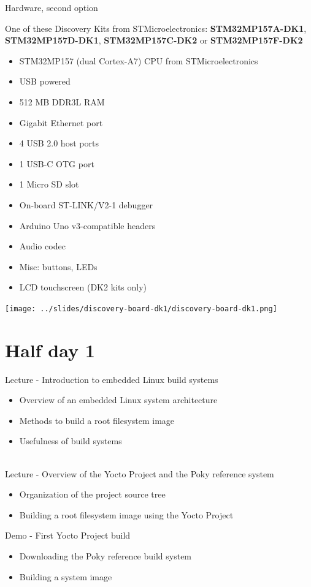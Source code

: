 \documentclass[a4paper,12pt,obeyspaces,spaces,hyphens]{article}
\begin{document}
\feagendatwocolumn
{Hardware, second option}
{
  One of these Discovery Kits from STMicroelectronics: {\bf
  STM32MP157A-DK1}, {\bf STM32MP157D-DK1}, {\bf STM32MP157C-DK2} or
  {\bf STM32MP157F-DK2}
  \begin{itemize}
  \item STM32MP157 (dual Cortex-A7) CPU from STMicroelectronics
  \item USB powered
  \item 512 MB DDR3L RAM
  \item Gigabit Ethernet port
  \item 4 USB 2.0 host ports
  \item 1 USB-C OTG port
  \item 1 Micro SD slot
  \item On-board ST-LINK/V2-1 debugger
  \item Arduino Uno v3-compatible headers
  \item Audio codec
  \item Misc: buttons, LEDs
  \item LCD touchscreen (DK2 kits only)
  \end{itemize}
}{}
{
  \begin{center}
    \texttt{[image: ../slides/discovery-board-dk1/discovery-board-dk1.png]}
  \end{center}
}

\section{Half day 1}

\feagendaonecolumn
{Lecture - Introduction to embedded Linux build systems}
{
  \begin{itemize}
  \item Overview of an embedded Linux system architecture
  \item Methods to build a root filesystem image
  \item Usefulness of build systems
  \end{itemize}
}
\\
\feagendatwocolumn
{Lecture - Overview of the Yocto Project and the Poky reference system}
{
  \begin{itemize}
  \item Organization of the project source tree
  \item Building a root filesystem image using the Yocto Project
  \end{itemize}
}
{Demo - First Yocto Project build}
{
  \begin{itemize}
  \item Downloading the Poky reference build system
  \item Building a system image
 \end{itemize}
}
\end{document}

